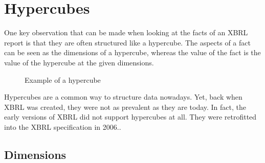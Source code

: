 \section{Hypercubes}
\label{sec:hypercubes}

One key observation that can be made when looking at the facts of an XBRL report is that they are often structured like a hypercube.
The aspects of a fact can be seen as the dimensions of a hypercube, whereas the value of the fact is the value of the hypercube at the given dimensions.

\begin{figure}[H]
    \caption{Example of a hypercube}
    \label{fig:example_hypercube}
\end{figure}

Hypercubes are a common way to structure data nowadays.
Yet, back when XBRL was created, they were not as prevalent as they are today.
In fact, the early versions of XBRL did not support hypercubes at all.
They were retrofitted into the XBRL specification in 2006.\cite{xbrl_dimensions}.

\subsection{Dimensions}

